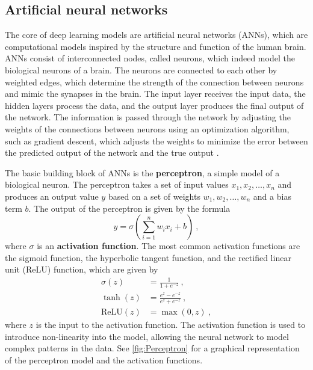 \subsection{\label{sec:Artificial neural networks} Artificial neural
  networks}

The core of deep learning models are artificial neural networks (ANNs), which
are computational models inspired by the structure and function of the human
brain. ANNs consist of interconnected nodes, called neurons, which indeed
model
the biological neurons of a brain. The neurons are connected to each other by
weighted edges, which determine the strength of the connection between
neurons
and mimic the synapses in the brain. The input layer receives the input data,
the hidden layers process the data, and the output layer produces the final
output of the network. The information is passed through the network by
adjusting the weights of the connections between neurons using an
optimization
algorithm, such as gradient descent, which adjusts the weights to minimize
the
error between the predicted output of the network and the true output
\cite{Goodfellow2016}.

The basic building block of ANNs is the \textbf{perceptron}, a simple model of
a
biological neuron. The perceptron takes a set of input values $x_1, x_2,
  \ldots, x_n$ and produces an output value $y$ based on a set of weights $w_1,
  w_2, \ldots, w_n$ and a bias term $b$. The output of the perceptron is given
by the formula
\begin{equation}
  y = \sigma(\sum_{i=1}^n w_ix_i + b) \ ,
\end{equation}
where $\sigma$ is an \textbf{activation function}. The most common activation
functions are the sigmoid function, the hyperbolic tangent function, and the
rectified linear unit (ReLU) function, which are given by
\begin{align}
  \sigma(z)      & = \frac{1}{1 + e^{-z}} \ ,              \\
  \tanh(z)       & = \frac{e^z - e^{-z}}{e^z + e^{-z}} \ , \\
  \text{ReLU}(z) & = \max(0, z) \ ,
\end{align}
where $z$ is the input to the activation function. The activation function is
used to introduce non-linearity into the model, allowing the neural network
to
model complex patterns in the data. See \cref{fig:Perceptron} for a graphical
representation of the perceptron model and the activation functions.

